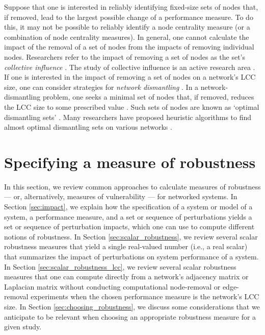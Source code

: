 \documentclass{comnet-mod}
\begin{document}
Suppose that one is interested in reliably identifying fixed-size sets of nodes that, if removed, lead to the largest possible change of a performance measure. To do this, it may not be possible to reliably identify a node centrality measure (or a combination of node centrality measures). In general, one cannot calculate the impact of the removal of a set of nodes from the impacts of removing individual nodes. Researchers refer to the impact of removing a set of nodes as the set's \textit{collective influence} \cite{Morone2015, Lue2016, Morone2016, Pei2019}. The study of collective influence is an active research area \cite{Braunstein2016, Lue2016, Mugisha2016, Zhu2018, Boltz2019}. If one is interested in the impact of removing a set of nodes on a network's LCC size, one can consider strategies for \textit{network dismantling} \cite{Braunstein2016, Zdeborova2016, Ren2019}. In a network-dismantling problem, one seeks a minimal set of nodes that, if removed, reduces the LCC size to some prescribed value \cite{Braunstein2016}. Such sets of nodes are known as `optimal dismantling sets' \cite{Braunstein2016, daCunha2017, deAbreu2018}. Many researchers have proposed heuristic algorithms to find almost optimal dismantling sets on various networks \cite{Morone2015, Braunstein2016, daCunha2017, deAbreu2018}.


\section{Specifying a measure of robustness}\label{sec:measures}


In this section, we review common approaches to calculate measures of robustness --- or, alternatively, measures of vulnerability --- for networked systems. In Section \ref{sec:impact}, we explain how the specification of a system or model of a system, a performance measure, and a set or sequence of perturbations yields a set or sequence of perturbation impacts, which one can use to compute different notions of robustness. In Section \ref{sec:scalar_robustness}, we review several scalar robustness measures that yield a single real-valued number (i.e., a real scalar) that summarizes the impact of perturbations on system performance of a system.
In Section \ref{sec:scalar_robustness_lcc}, we review several scalar robustness measures that one can compute directly from a network's adjacency matrix or Laplacian matrix without conducting computational node-removal or edge-removal experiments when the chosen performance measure is the network's LCC size.
In Section \ref{sec:choosing_robustness}, we discuss some considerations that we anticipate to be relevant when choosing an appropriate robustness measure for a given study.
\end{document}
